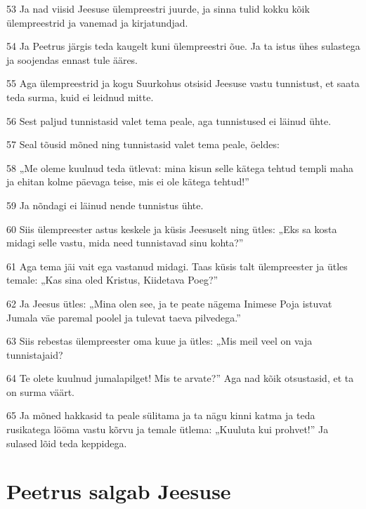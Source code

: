 \par 53 Ja nad viisid Jeesuse ülempreestri juurde, ja sinna tulid kokku kõik ülempreestrid ja vanemad ja kirjatundjad.
\par 54 Ja Peetrus järgis teda kaugelt kuni ülempreestri õue. Ja ta istus ühes sulastega ja soojendas ennast tule ääres.
\par 55 Aga ülempreestrid ja kogu Suurkohus otsisid Jeesuse vastu tunnistust, et saata teda surma, kuid ei leidnud mitte.
\par 56 Sest paljud tunnistasid valet tema peale, aga tunnistused ei läinud ühte.
\par 57 Seal tõusid mõned ning tunnistasid valet tema peale, öeldes:
\par 58 „Me oleme kuulnud teda ütlevat: mina kisun selle kätega tehtud templi maha ja ehitan kolme päevaga teise, mis ei ole kätega tehtud!”
\par 59 Ja nõndagi ei läinud nende tunnistus ühte.
\par 60 Siis ülempreester astus keskele ja küsis Jeesuselt ning ütles: „Eks sa kosta midagi selle vastu, mida need tunnistavad sinu kohta?”
\par 61 Aga tema jäi vait ega vastanud midagi. Taas küsis talt ülempreester ja ütles temale: „Kas sina oled Kristus, Kiidetava Poeg?”
\par 62 Ja Jeesus ütles: „Mina olen see, ja te peate nägema Inimese Poja istuvat Jumala väe paremal poolel ja tulevat taeva pilvedega.”
\par 63 Siis rebestas ülempreester oma kuue ja ütles: „Mis meil veel on vaja tunnistajaid?
\par 64 Te olete kuulnud jumalapilget! Mis te arvate?” Aga nad kõik otsustasid, et ta on surma väärt.
\par 65 Ja mõned hakkasid ta peale sülitama ja ta nägu kinni katma ja teda rusikatega lööma vastu kõrvu ja temale ütlema: „Kuuluta kui prohvet!” Ja sulased lõid teda keppidega.

\section*{Peetrus salgab Jeesuse}

